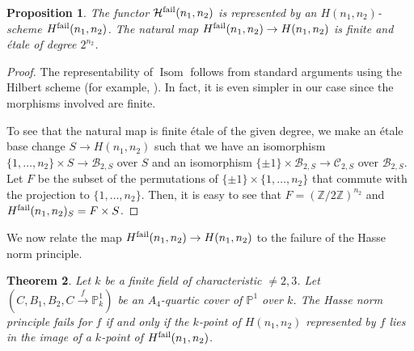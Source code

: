 \documentclass{amsart}
\numberwithin{equation}{section} \numberwithin{figure}{section}
\newcommand\PP{\mathbb{P}}
\newcommand\ZZ{\mathbb{Z}}
\newcommand{\cH}{\mathcal{H}}
\theoremstyle{one}
\newtheorem{theorem}{\textbf{Theorem}}[section]
\newtheorem{proposition}[theorem]{\textbf{Proposition}}
\theoremstyle{definition}
\begin{document}
\begin{proposition}
  The functor \(\cH^{\rm fail}(n_1,n_2)\) is represented by an \(H(n_1,n_2)\)-scheme \(H^{\rm fail}(n_1,n_2)\).
  The natural map \(H^{\rm fail}(n_1,n_2) \to H(n_1,n_2)\) is finite and \'etale of degree \(2^{n_2}\).
\end{proposition}
\begin{proof}
  The representability of \(\operatorname{Isom}\) follows from standard arguments using the Hilbert scheme (for example, \cite[\S~4 Variantes]{gro:61}).
  In fact, it is even simpler in our case since the morphisms involved are finite.

  To see that the natural map is finite \'etale of the given degree, we make an \'etale base change \(S \to H(n_1,n_2)\) such that we have an isomorphism \(\{1,\dots, n_2\} \times S \to \mathcal{B}_{2,S}\) over \(S\) and an isomorphism \(\{\pm 1\} \times \mathcal{B}_{2,S} \to \mathcal{C}_{2,S}\) over \(\mathcal{B}_{2,S}\).
  Let \(F\) be the subset of the permutations of \(\{\pm 1\} \times \{1, \dots, n_2\}\) that commute with the projection to \(\{1,\dots,n_2\}\).
  Then, it is easy to see that \(F = (\ZZ/2\ZZ)^{n_2}\) and \(H^{\rm fail}(n_1,n_2)_S = F \times S\).
\end{proof}
We now relate the map \(H^{\rm fail}(n_1,n_2) \to H(n_1,n_2)\) to the failure of the Hasse norm principle.
\begin{theorem}\label{thm:failset}
  Let \(k\) be a finite field of characteristic \(\neq 2,3\).
  Let \((C, B_1, B_2,  C \xrightarrow{f} \PP^1_k)\) be an \(A_4\)-quartic cover of \(\PP^1\) over \(k\).
  The Hasse norm principle fails for \(f\) if and only if the \(k\)-point of \(H(n_1,n_2)\) represented by \(f\) lies in the image of a \(k\)-point of \(H^{\rm fail}(n_1,n_2)\).
\end{theorem}
\end{document}
